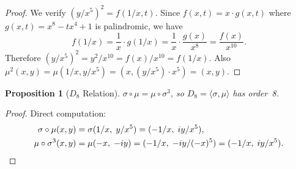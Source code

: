 \documentclass[11pt]{article}
\theoremstyle{plain}
\newtheorem{proposition}[theorem]{Proposition}
\theoremstyle{definition}
\theoremstyle{remark}
\begin{document}
\begin{proof}
We verify $(y/x^5)^2 = f(1/x, t)$.  Since $f(x,t) = x \cdot g(x,t)$
where $g(x,t) = x^8 - tx^4 + 1$ is palindromic, we have
\[
  f(1/x) = \frac{1}{x} \cdot g(1/x) = \frac{1}{x} \cdot \frac{g(x)}{x^8}
  = \frac{f(x)}{x^{10}}.
\]
Therefore $(y/x^5)^2 = y^2/x^{10} = f(x)/x^{10} = f(1/x)$.
Also $\mu^2(x,y) = \mu(1/x, y/x^5) = (x, (y/x^5) \cdot x^5) = (x,y)$.
\end{proof}

\begin{proposition}[$D_8$ Relation]\label{prop:D8}
$\sigma \circ \mu = \mu \circ \sigma^3$, so
$D_8 = \langle \sigma, \mu \rangle$ has order~8.
\end{proposition}

\begin{proof}
Direct computation:
\begin{align*}
  \sigma \circ \mu(x,y) &= \sigma(1/x,\; y/x^5)
    = (-1/x,\; iy/x^5), \\
  \mu \circ \sigma^3(x,y) &= \mu(-x,\; -iy)
    = (-1/x,\; -iy/(-x)^5)
    = (-1/x,\; iy/x^5). \qedhere
\end{align*}
\end{proof}
\end{document}
